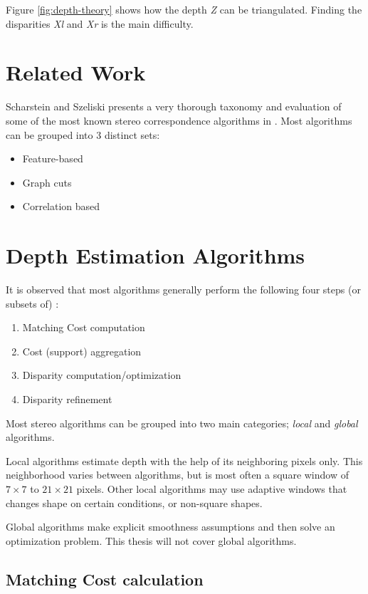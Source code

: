 Figure \ref{fig:depth-theory} shows how the depth \textit{Z} can be
triangulated. Finding the disparities \textit{Xl} and
\textit{Xr} is the main difficulty.


\section{Related Work}

Scharstein and Szeliski presents a very thorough taxonomy and
evaluation of some of the most known stereo correspondence algorithms
in \cite{taxonomy}. Most algorithms can be grouped into 3 distinct
sets:

\begin{itemize}
\item Feature-based
\item Graph cuts
\item Correlation based
\end{itemize}




\section{Depth Estimation Algorithms}

It is observed that most algorithms generally perform the following
four steps (or subsets of) \cite{taxonomy} :

\begin{enumerate}
\item Matching Cost computation
\item Cost (support) aggregation
\item Disparity computation/optimization
\item Disparity refinement
\end{enumerate}

Most stereo algorithms can be grouped into two main categories;
\textit{local} and \textit{global} algorithms.

Local algorithms estimate depth with the help of its neighboring
pixels only. This neighborhood varies between algorithms, but is most
often a square window of $7\times7$ to $21\times21$ pixels. Other
local algorithms may use adaptive windows that changes shape on
certain conditions, or non-square shapes.

Global algorithms make explicit smoothness assumptions and then solve
an optimization problem. This thesis will not cover global algorithms.

\subsection{Matching Cost calculation}
\label{sec:matchingcost}

